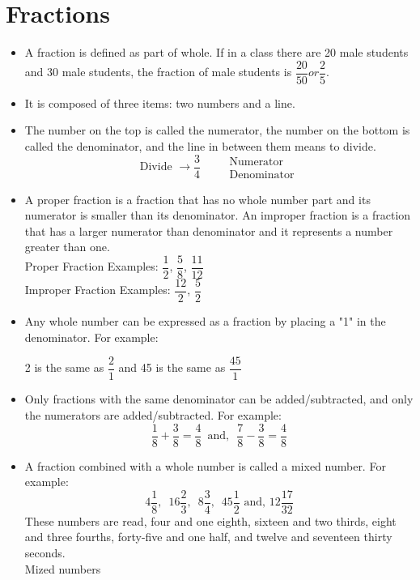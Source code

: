 \section{Fractions}
\begin{itemize}
\item A fraction is defined as part of whole.  If in a class there are 20 male students and 30 male students, the fraction of male students is $\dfrac{20}{50} or \dfrac{2}{5}$.
\item It is composed of three items: two numbers and a line.
\item The number on the top is called the numerator, the number on the bottom is called the denominator, and the line in between them means to divide. 
$$
\text { Divide } \longrightarrow \dfrac{3}{4} \quad \begin{aligned}
&\text { Numerator } \\
&\text { Denominator }
\end{aligned}
$$
\item A proper fraction is a fraction that has no whole number part and its numerator is smaller than its denominator. An improper fraction is a fraction that has a larger numerator than denominator and it represents a number greater than one.\\
Proper Fraction Examples: $\dfrac{1}{2}$, $\dfrac{5}{8}$, $\dfrac{11}{12}$\\
\vspace{0.2cm}
Improper Fraction Examples: $\dfrac{12}{2}$, $\dfrac{5}{2}$
\item Any whole number can be expressed as a fraction by placing a "1" in the denominator. For example:

2 is the same as $\dfrac{2}{1}$ and 45 is the same as $\dfrac{45}{1}$

\item Only fractions with the same denominator can be added/subtracted, and only the numerators are added/subtracted. For example:
$$
\dfrac{1}{8}+\dfrac{3}{8}=\dfrac{4}{8}  \enspace  \text {and},  \enspace \dfrac{7}{8}-\dfrac{3}{8}=\dfrac{4}{8}
$$

\item A fraction combined with a whole number is called a mixed number. For example:
$$
4 \dfrac{1}{8}, \enspace 16 \dfrac{2}{3}, \enspace  8 \dfrac{3}{4}, \enspace  45  \dfrac{1}{2} \text { and, } 12\dfrac{17}{32}
$$
These numbers are read, four and one eighth, sixteen and two thirds, eight and three fourths, forty-five and one half, and twelve and seventeen thirty seconds.\\
Mized numbers 


\end{itemize}
